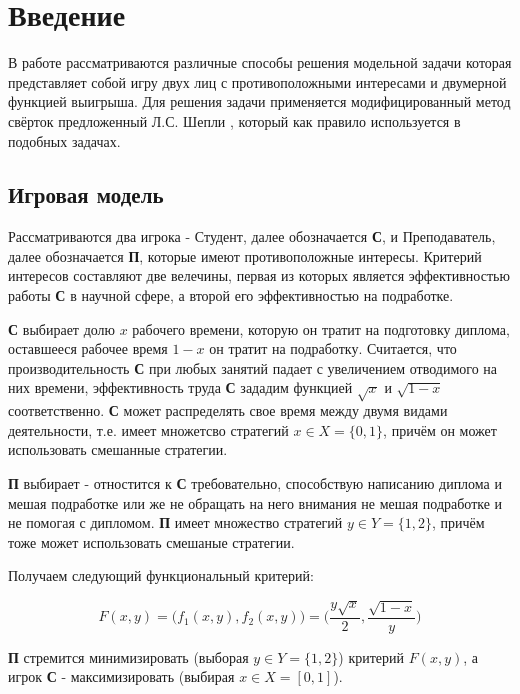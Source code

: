 \section{Введение}

\qquad В работе рассматриваются различные способы решения модельной задачи которая
представляет собой игру двух лиц с противоположными интересами и двумерной
функцией выигрыша. Для решения задачи применяется модифицированный
метод свёрток предложенный Л.С. Шепли \cite{shapley}, который как правило используется в
подобных задачах.

\subsection{Игровая модель}

\qquad Рассматриваются два игрока - Студент, далее обозначается \textbf{С},
и Преподаватель, далее обозначается \textbf{П}, которые имеют противоположные интересы.
Критерий интересов составляют две велечины, первая из которых является эффективностью
работы \textbf{С} в научной сфере, а второй его эффективностью на подработке.

\textbf{С} выбирает долю $x$ рабочего времени, которую он тратит на подготовку
диплома, оставшееся рабочее время $1-x$ он тратит на подработку. Считается, что производительность \textbf{С} при любых занятий падает с увеличением 
отводимого на них времени, эффективность труда \textbf{С} зададим функцией $\sqrt{x}$
и $\sqrt{1-x}$ соответственно. \textbf{С} может распределять свое время между двумя 
видами деятельности, т.е. имеет множетсво стратегий $x\in X = \{0, 1\}$, 
причём он может использовать смешанные стратегии.

\textbf{П} выбирает - отностится к \textbf{С} требовательно, способствую 
написанию диплома и мешая подработке или же не обращать на него внимания не 
мешая подработке и не помогая с дипломом. \textbf{П} имеет множество стратегий 
$y \in Y=\{1, 2\}$, причём тоже может использовать смешаные стратегии.

\vspace{5mm}
Получаем следующий функциональный критерий:

\begin{equation}
	F(x, y)=
	\big(f_1(x,y), f_2(x,y)\big) =
	\Big(
		\frac{y\sqrt{x}}2,
		\frac{\sqrt{1-x}}y
	\Big)
	\label{eq:player_criterion}
\end{equation}

\qquad \textbf{П} стремится минимизировать (выборая $y \in Y = \{1,2\}$)
критерий $F(x, y)$, а игрок \textbf{С} - максимизировать
 (выбирая $x \in X=[0,1]$).

